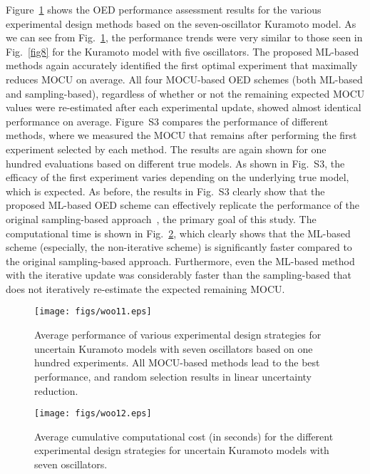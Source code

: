 \documentclass{article}
\begin{document}
Figure~\ref{fig11} shows the OED performance assessment results for the various experimental design methods based on the seven-oscillator Kuramoto model. As we can see from Fig.~\ref{fig11}, the performance trends were very similar to those seen in Fig.~\ref{fig8} for the Kuramoto model with five oscillators. The proposed ML-based methods again accurately identified the first optimal experiment that maximally reduces MOCU on average. All four MOCU-based OED schemes (both ML-based and sampling-based), regardless of whether or not the remaining expected MOCU values were re-estimated after each experimental update, showed almost identical performance on average. Figure~S3 compares the performance of different methods, where we measured the MOCU that remains after performing the first experiment selected by each method. The results are again shown for one hundred evaluations based on different true models. As shown in Fig.~S3, the efficacy of the first experiment varies depending on the underlying true model, which is expected. As before, the results in Fig.~S3 clearly show that the proposed ML-based OED scheme can effectively replicate the performance of the original sampling-based approach~\cite{Hong2021}, the primary goal of this study. The computational time is shown in Fig.~\ref{fig12}, which clearly shows that the ML-based scheme (especially, the non-iterative scheme) is significantly faster compared to the original sampling-based approach. Furthermore, even the ML-based method with the iterative update was considerably faster than the sampling-based that does not iteratively re-estimate the expected remaining MOCU. 
\begin{figure}
\centering
\texttt{[image: figs/woo11.eps]}
\caption{Average performance of various experimental design strategies for uncertain Kuramoto models with seven oscillators based on one hundred experiments. All MOCU-based methods lead to the best performance, and random selection results in linear uncertainty reduction.}
\label{fig11}
\end{figure}
\begin{figure}
\centering
\texttt{[image: figs/woo12.eps]}
\caption{
Average cumulative computational cost (in seconds) for the different experimental design strategies for uncertain Kuramoto models with seven oscillators.}
\label{fig12}
\end{figure}
\end{document}
